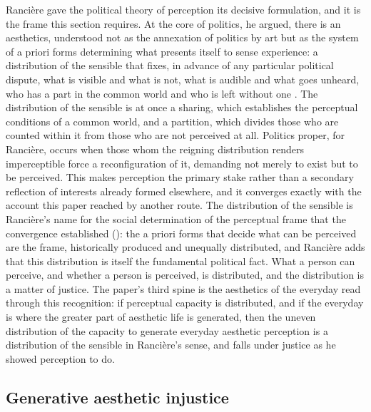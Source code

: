 Ranci\`ere gave the political theory of perception its decisive formulation, and it is the frame this section requires. At the core of politics, he argued, there is an aesthetics, understood not as the annexation of politics by art but as the system of a priori forms determining what presents itself to sense experience: a distribution of the sensible that fixes, in advance of any particular political dispute, what is visible and what is not, what is audible and what goes unheard, who has a part in the common world and who is left without one \parencite{ranciere2004}. The distribution of the sensible is at once a sharing, which establishes the perceptual conditions of a common world, and a partition, which divides those who are counted within it from those who are not perceived at all. Politics proper, for Ranci\`ere, occurs when those whom the reigning distribution renders imperceptible force a reconfiguration of it, demanding not merely to exist but to be perceived. This makes perception the primary stake rather than a secondary reflection of interests already formed elsewhere, and it converges exactly with the account this paper reached by another route. The distribution of the sensible is Ranci\`ere's name for the social determination of the perceptual frame that the convergence established (): the a priori forms that decide what can be perceived are the frame, historically produced and unequally distributed, and Ranci\`ere adds that this distribution is itself the fundamental political fact. What a person can perceive, and whether a person is perceived, is distributed, and the distribution is a matter of justice. The paper's third spine is the aesthetics of the everyday read through this recognition: if perceptual capacity is distributed, and if the everyday is where the greater part of aesthetic life is generated, then the uneven distribution of the capacity to generate everyday aesthetic perception is a distribution of the sensible in Ranci\`ere's sense, and falls under justice as he showed perception to do.

\subsection{Generative aesthetic injustice}
\label{p23:sub:dist-injustice}

